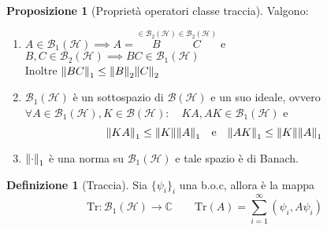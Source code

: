 \documentclass[a4paper,10pt]{article}
\theoremstyle{definition}
\newcommand{\im}{\mathbb{C}} %
\newcommand{\hil}{\mathcal{H}} %
\theoremstyle{indentdefinition}
\newtheorem{defn}{Definizione}[section]
\theoremstyle{indenttheorem}
\newtheorem{prop}{Proposizione}
\theoremstyle{myremark}
\theoremstyle{indentgeneral}
\begin{document}
\begin{prop}[Proprietà operatori classe traccia] \label{thm-prop-op-classe-traccia}
    Valgono:
    \begin{enumerate}
        \item $A\in\mathcal{B}_1(\hil)\implies A=\overset{\in\mathcal{B}_2(\hil)}{B}\overset{\in\mathcal{B}_2(\hil)}{C}$ e $B,C\in\mathcal{B}_2(\hil)\implies BC\in \mathcal{B}_1(\hil)$\\
        Inoltre $\norm{BC}_1\le \norm{B}_2\norm{C}_2$
        \item $\mathcal{B}_1(\hil)$ è un sottospazio di $\mathcal{B}(\hil)$ e un suo ideale, ovvero $\forall A\in \mathcal{B}_1(\hil),K\in\mathcal{B}(\hil): \quad KA,AK\in\mathcal{B}_1(\hil)$ e 
        $$\norm{KA}_1\le \norm{K}\norm{A}_1 \quad \text{e} \quad \norm{AK}_1\le \norm{K}\norm{A}_1$$
        \item $\norm{\cdot}_1$ è una norma su $\mathcal{B}_1(\hil)$ e tale spazio è di Banach.
    \end{enumerate}
\end{prop}

\begin{defn}[Traccia]
Sia $\{\psi_i\}_i$ una b.o.c, allora è la mappa
$$\text{Tr}:\mathcal{B}_1(\hil)\to \im\qquad \text{Tr}(A)=\sum_{i=1}^\infty(\psi_i,A\psi_i)$$
\end{defn}
\end{document}
